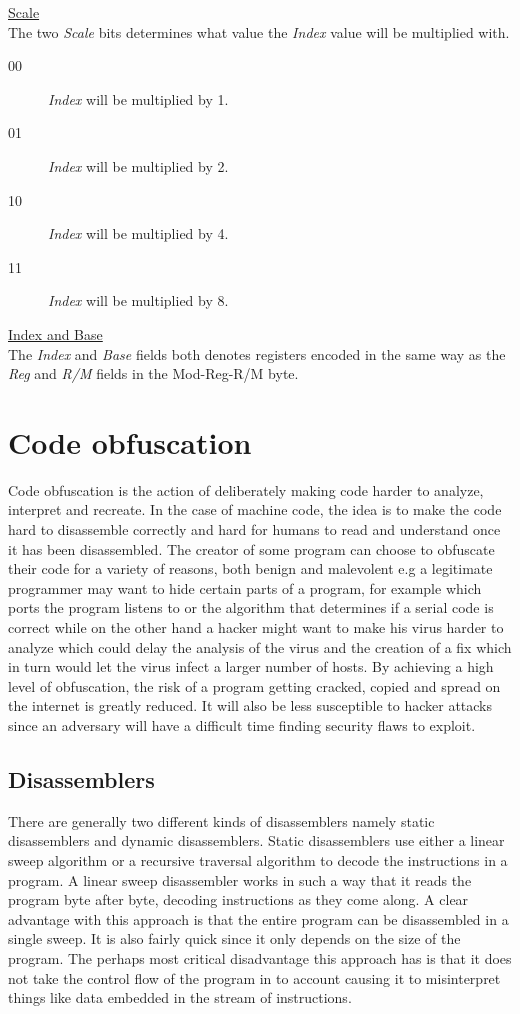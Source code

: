 \documentclass[11pt,twoside]{eitExjobb}
\begin{document}
\noindent \uline{Scale}\\
The two \emph{Scale} bits determines what value the \emph{Index} value will be multiplied with.\\
\begin{description}
\item[00] \emph{Index} will be multiplied by 1.  
\item[01] \emph{Index} will be multiplied by 2.
\item[10] \emph{Index} will be multiplied by 4.
\item[11] \emph{Index} will be multiplied by 8.
\end{description}

\noindent \uline{Index and Base}\\
The \emph{Index} and \emph{Base} fields both denotes registers encoded in the same way as the \emph{Reg} and \emph{R/M} fields in the Mod-Reg-R/M byte. \cite{bittwiddling}\cite{assemblylanguagex86}

\section{Code obfuscation}
Code obfuscation is the action of deliberately making code harder to analyze, interpret and recreate. In the case of machine code, the idea is to make the code hard to disassemble correctly and hard for humans to read and understand once it has been disassembled. The creator of some program can choose to obfuscate their code for a variety of reasons, both benign and malevolent e.g a legitimate programmer may want to hide certain parts of a program, for example which ports the program listens to or the algorithm that determines if a serial code is correct while on the other hand  a hacker might  want to make his virus harder to analyze which could delay the analysis of the virus and the creation of a fix which in turn would let the virus infect a larger number of hosts. By achieving a high level of obfuscation, the risk of a program getting cracked, copied and spread on the internet is greatly reduced. It will also be less susceptible to hacker attacks since an adversary will have a difficult time finding security flaws to exploit.

\subsection{Disassemblers}
There are generally two different kinds of disassemblers namely static disassemblers and dynamic disassemblers. Static disassemblers use either a linear sweep algorithm or a recursive traversal algorithm to decode the instructions in a program. A linear sweep disassembler works in such a way that it reads the program byte after byte, decoding instructions as they come along. A clear advantage with this approach is that the entire program can be disassembled in a single sweep. It is also fairly quick since it only depends on the size of the program. The perhaps most critical disadvantage this approach has is that it does not take the control flow of the program in to account causing it to misinterpret things like data embedded in the stream of instructions.
\end{document}
